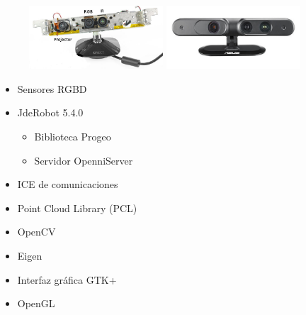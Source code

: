 \documentclass[notes,slidesec,a4]{seminar}
\begin{document}

\begin{hslide}
	\begin{minipage}{4cm}
		\begin{center}
			\begin{figure}
				\includegraphics[width=5cm] {img/ros_kinect.jpg}
				\includegraphics[width=5cm] {img/xtion-pro-live.jpg}
			\end{figure}
		\end{center}
	\end{minipage} \hfill
	\begin{minipage}{5cm}
		\begin{itemize}
			\item Sensores RGBD
			\item JdeRobot 5.4.0
			\begin{itemize}
				\item Biblioteca Progeo
				\item Servidor OpenniServer
			\end{itemize}
			\item ICE de comunicaciones
			\item Point Cloud Library (PCL)
			\item OpenCV
			\item Eigen
			\item Interfaz gráfica GTK+
			\item OpenGL
		\end{itemize}
	\end{minipage}
\end{hslide}
\end{document}
